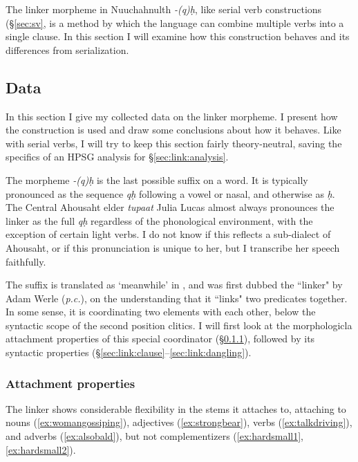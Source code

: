 The linker morpheme in Nuuchahnulth \textit{-(q)ḥ}, like serial verb constructions (\S\ref{sec:sv}, is a method by which the language can combine multiple verbs into a single clause. In this section I will examine how this construction behaves and its differences from serialization.

\subsection{Data} \label{sec:link:data}

In this section I give my collected data on the linker morpheme. I present how the construction is used and draw some conclusions about how it behaves. Like with serial verbs, I will try to keep this section fairly theory-neutral, saving the specifics of an HPSG analysis for \S\ref{sec:link:analysis}.

The morpheme \textit{-(q)ḥ} is the last possible suffix on a word. It is typically pronounced as the sequence \textit{qḥ} following a vowel or nasal, and otherwise as \textit{ḥ}. The Central Ahousaht elder \textit{tupaat} Julia Lucas almost always pronounces the linker as the full \textit{qḥ} regardless of the phonological environment, with the exception of certain light verbs. I do not know if this reflects a sub-dialect of Ahousaht, or if this pronunciation is unique to her, but I transcribe her speech faithfully.

The suffix is translated as `meanwhile' in \cite{sapir1939}, and was first dubbed the ``linker" by Adam Werle (\textit{p.c.}), on the understanding that it ``links" two predicates together. In some sense, it is coordinating two elements with each other, below the syntactic scope of the second position clitics. I will first look at the morphologicla attachment properties of this special coordinator (\S\ref{sec:link:attach}), followed by its syntactic properties (\S\ref{sec:link:clause}--\ref{sec:link:dangling}).

\subsubsection{Attachment properties} \label{sec:link:attach}

The linker shows considerable flexibility in the stems it attaches to, attaching to nouns (\ref{ex:womangossiping}), adjectives (\ref{ex:strongbear}), verbs (\ref{ex:talkdriving}), and adverbs (\ref{ex:alsobald}), but not complementizers (\ref{ex:hardsmall1}, \ref{ex:hardsmall2}).

